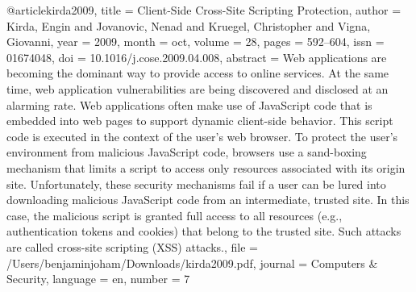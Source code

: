 @article{kirda2009,
  title = {Client-Side Cross-Site Scripting Protection},
  author = {Kirda, Engin and Jovanovic, Nenad and Kruegel, Christopher and Vigna, Giovanni},
  year = {2009},
  month = oct,
  volume = {28},
  pages = {592--604},
  issn = {01674048},
  doi = {10.1016/j.cose.2009.04.008},
  abstract = {Web applications are becoming the dominant way to provide access to online services. At the same time, web application vulnerabilities are being discovered and disclosed at an alarming rate. Web applications often make use of JavaScript code that is embedded into web pages to support dynamic client-side behavior. This script code is executed in the context of the user's web browser. To protect the user's environment from malicious JavaScript code, browsers use a sand-boxing mechanism that limits a script to access only resources associated with its origin site. Unfortunately, these security mechanisms fail if a user can be lured into downloading malicious JavaScript code from an intermediate, trusted site. In this case, the malicious script is granted full access to all resources (e.g., authentication tokens and cookies) that belong to the trusted site. Such attacks are called cross-site scripting (XSS) attacks.},
  file = {/Users/benjaminjoham/Downloads/kirda2009.pdf},
  journal = {Computers \& Security},
  language = {en},
  number = {7}
}

